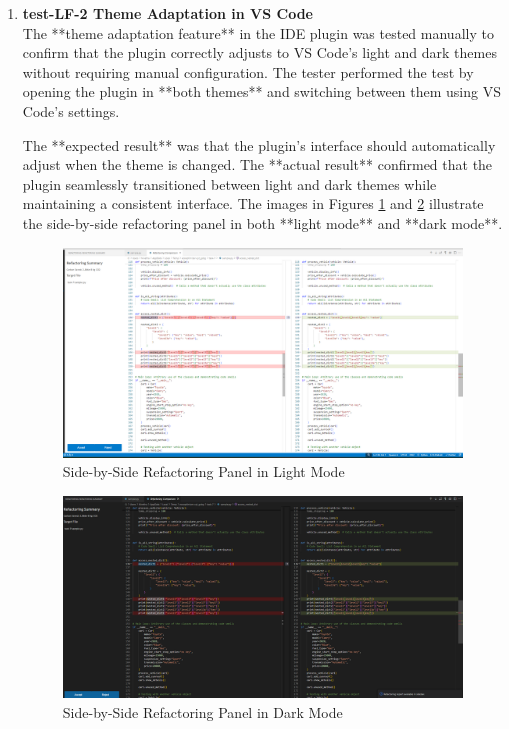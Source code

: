 \documentclass[12pt, titlepage]{article}
\begin{document}
\begin{enumerate}
\item \textbf{test-LF-2 Theme Adaptation in VS Code} \\[2mm]
The **theme adaptation feature** in the IDE plugin was tested manually to confirm that the plugin correctly adjusts to VS Code’s light and dark themes without requiring manual configuration. The tester performed the test by opening the plugin in **both themes** and switching between them using VS Code’s settings.

The **expected result** was that the plugin’s interface should automatically adjust when the theme is changed. The **actual result** confirmed that the plugin seamlessly transitioned between light and dark themes while maintaining a consistent interface. The images in Figures \ref{fig:lf2_light} and \ref{fig:lf2_dark} illustrate the side-by-side refactoring panel in both **light mode** and **dark mode**.

\FloatBarrier
\begin{figure}[h]
    \centering
    \includegraphics[width=0.8\linewidth]{../Images/test-LF-2-image-light.png}
    \caption{Side-by-Side Refactoring Panel in Light Mode}
    \label{fig:lf2_light}
\end{figure}
\FloatBarrier 

\FloatBarrier 
\begin{figure}[h]
    \centering
    \includegraphics[width=0.8\linewidth]{../Images/test-LF-2-image-dark.png}
    \caption{Side-by-Side Refactoring Panel in Dark Mode}
    \label{fig:lf2_dark}
\end{figure}
\FloatBarrier 


\end{enumerate}
\end{document}
